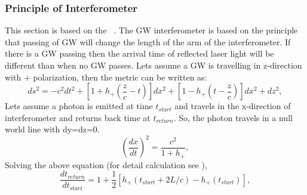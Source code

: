 \documentclass{ttuthes2007}
\begin{document}
\subsubsection{Principle of Interferometer}
This section is based on the ~\cite{Sathyaprakash_2009}. The
\ac{GW} interferometer is based on the principle that passing of \ac{GW} will
change the length of the arm of the interferometer. If there is a \ac{GW}
passing then the arrival time of reflected laser light will be different than when no
\ac{GW} passes. Lets assume a \ac{GW} is travelling in z-direction with +
polarization, then the metric can be written as:
\begin{equation}
ds^2= -c^2dt^2+[1+h_+(\frac{z}{c}-t)]dx^2+[1-h_+(t-\frac{z}{c})]dx^2+dz^2,
\end{equation}
Lets assume a photon is emitted at time $t_{start}$ and travels
in the x-direction of interferometer and returns back time at $t_{return}$. So,
the photon travels in a null world line with dy=dz=0.
\begin{equation}
\left(\frac{dx}{dt}\right)^2=\frac{c^2}{1+h_+},
\end{equation}
Solving the above equation (for detail calculation see \cite{Schutz:1985jx}),
\begin{equation}
\frac{dt_{return}}{dt_{start}}=1+\frac{1}{2}[h_+(t_{start}+2L/c)-h_+(t_{start})],
\end{equation}
\end{document}
